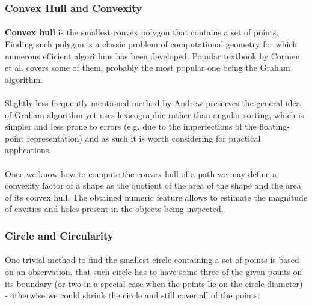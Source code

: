 \subsubsection{Convex Hull and Convexity}

\paragraph*{}
\textbf{Convex hull} is the smallest convex polygon that contains a set of points. Finding such polygon is a classic problem of computational geometry for which numerous efficient algorithms has been developed. Popular textbook by Cormen et al. covers\cite{Cormen01} some of them, probably the most popular one being the Graham algorithm.

\paragraph*{}
Slightly less frequently mentioned method\cite{Andrew79} by Andrew preserves the general idea of Graham algorithm yet uses lexicographic rather than angular sorting, which is simpler and less prone to errors (e.g. due to the imperfections of the floating-point representation) and as such it is worth considering for practical applications.

\paragraph*{}
Once we know how to compute the convex hull of a path we may define a convexity factor of a shape as the quotient of the area of the shape and the area of its convex hull. The obtained numeric feature allows to estimate the magnitude of cavities and holes present in the objects being inspected.

\subsubsection{Circle and Circularity}

\paragraph*{}
One trivial method to find the smallest circle containing a set of points is based on an observation, that such circle has to have some three of the given points on its boundary (or two in a special case when the points lie on the circle diameter) - otherwise we could shrink the circle and still cover all of the points. 

